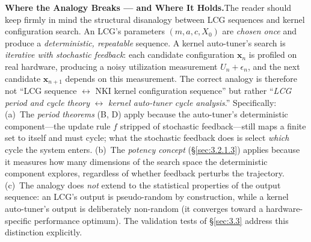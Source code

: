 \documentclass[12pt]{article}
\newcommand{\KernelConfig}{\mathbf{x}}           %
\begin{document}
\smallskip
\noindent\textbf{Where the Analogy Breaks --- and Where It Holds.}\quad The reader should keep firmly in mind the structural disanalogy between LCG sequences and kernel configuration search. An LCG's parameters $(m, a, c, X_0)$ are \emph{chosen once} and produce a \emph{deterministic, repeatable} sequence. A kernel auto-tuner's search is \emph{iterative with stochastic feedback}: each candidate configuration $\KernelConfig_n$ is profiled on real hardware, producing a noisy utilization measurement $U_n + \epsilon_n$, and the next candidate $\KernelConfig_{n+1}$ depends on this measurement. The correct analogy is therefore not ``LCG sequence $\leftrightarrow$ NKI kernel configuration sequence'' but rather ``\emph{LCG period and cycle theory} $\leftrightarrow$ \emph{kernel auto-tuner cycle analysis}.'' Specifically: (a)~The \emph{period theorems} (B, D) apply because the auto-tuner's deterministic component---the update rule $f$ stripped of stochastic feedback---still maps a finite set to itself and must cycle; what the stochastic feedback does is select \emph{which} cycle the system enters. (b)~The \emph{potency concept} (\S\ref{sec:3.2.1.3}) applies because it measures how many dimensions of the search space the deterministic component explores, regardless of whether feedback perturbs the trajectory. (c)~The analogy does \emph{not} extend to the statistical properties of the output sequence: an LCG's output is pseudo-random by construction, while a kernel auto-tuner's output is deliberately non-random (it converges toward a hardware-specific performance optimum). The validation tests of \S\ref{sec:3.3} address this distinction explicitly.

\medskip
\end{document}
